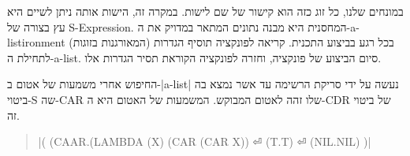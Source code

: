 במונחים שלנו, כל זוג כזה הוא קישור של שם לישות. במקרה זה, הישות אותה
ניתן לשיים היא עץ בצורה של S-Expression. המחסנית היא מבנה
נתונים המתאר במדויק את ה-a-listironment בכל רגע בביצוע התכנית. קריאה לפונקציה
תוסיף הגדרות (המאורגנות בזוגות) לתחילת ה-a-list. סיום הביצוע של פונקציה, וחזרה
לפונקציה הקוראת תסיר הגדרות אלו.

החיפוש אחרי משמעות של
אטום ב-\E|a-list| נעשה על ידי סריקת הרשימה עד אשר נמצא בה ביטוי-S שה-CAR שלו
זהה לאטום המבוקש. המשמעות של האטום היא ה-CDR של ביטוי זה.

\begin{english}
  \begin{quote}
    \T|(
    (CAAR.(LAMBDA (X) (CAR (CAR X)) ⏎
    (T.T) ⏎
    (NIL.NIL)
)|
  \end{quote}
\end{english}
